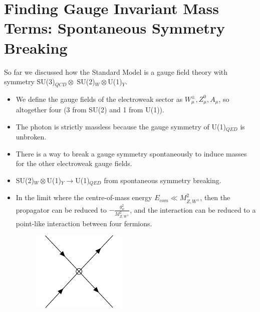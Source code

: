 \documentclass[a4paper, 11pt, normalem]{report}
\begin{document}
\chapter{Finding Gauge Invariant Mass Terms: Spontaneous Symmetry Breaking}
    So far we discussed how the Standard Model is a gauge field theory with symmetry SU(3)$_{QCD}\otimes$ SU(2)$_W\otimes$U(1)$_{Y}$.
\begin{itemize}
    \item We define the gauge fields of the electroweak sector as $W^\pm_\mu,Z_\mu^0,A_\mu$, so altogether four (3 from SU(2) and 1 from U(1)).
    \item The photon is strictly massless because the gauge symmetry of U(1)$_{QED}$ is unbroken.
    \item There is a way to break a gauge symmetry spontaneously to induce masses for the other electroweak gauge fields.
    \item SU(2)$_W\otimes$U(1)$_Y\to$U(1)$_{QED}$ from spontaneous symmetry breaking.
    \item In the limit where the centre-of-mass energy $E_{com}\ll M_{Z,W^{\pm}}^2$, then the propagator can be reduced to $-\frac{g_{w}^2}{M_{Z,W^{\pm}}^2}$, and the interaction can be reduced to a point-like interaction between four fermions.
        \begin{figure}[H]
            \centering
            \includegraphics[scale=0.8]{diagrams/fermi.pdf}
        \end{figure}
\end{itemize}
\end{document}
